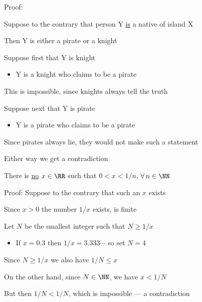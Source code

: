 \begin{frame}
    
    Proof: 
    
    Suppose to the contrary that person Y \underline{is} a native of island X

    Then Y is either a pirate or a knight

    Suppose first that Y is knight

    \begin{itemize}
        \item Y is a knight who claims to be a pirate
    \end{itemize}
    
    This is impossible, since knights always tell the truth

    Suppose next that Y is pirate

    \begin{itemize}
        \item Y is a pirate who claims to be a pirate
    \end{itemize}

    Since pirates always lie, they would not make such a statement

    Either way we get a contradiction


\end{frame}


\begin{frame}
    
    \Eg There is \underline{no} $x \in \RR$ such that $0 < x < 1/n$, $\forall \,
    n \in \NN$


    Proof: Suppose to the contrary that such an $x$ exists

    \begin{figure}[h]
       \begin{center}
        \scalebox{.4}{}
       \end{center}
    \end{figure}

    Since $x > 0$ the number $1/x$ exists, is finite

    Let $N$ be the smallest integer such that $N \geq 1/x$

    \begin{itemize}
        \item If $x = 0.3$ then $1/x = 3.333\cdots$ so set $N = 4$
    \end{itemize}

    Since $N \geq 1/x$ we also have $1/N \leq x$

    On the other hand, since $N \in \NN$, we have $x < 1/N$

    But then $1/N < 1/N$, which is impossible --- a contradiction

\end{frame}

